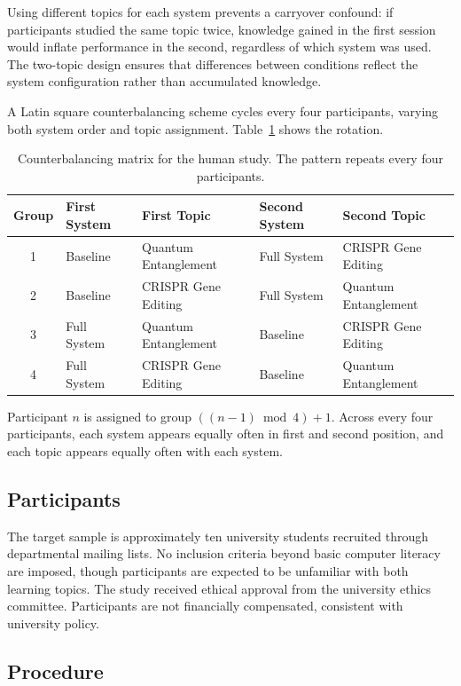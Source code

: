 \documentclass[logo,bsc,singlespacing,parskip,online]{infthesis}
\begin{document}
Using different topics for each system prevents a carryover confound: if participants studied the same topic twice, knowledge gained in the first session would inflate performance in the second, regardless of which system was used. The two-topic design ensures that differences between conditions reflect the system configuration rather than accumulated knowledge.

A Latin square counterbalancing scheme cycles every four participants, varying both system order and topic assignment. Table~\ref{tab:counterbalancing} shows the rotation.

\begin{table}[ht]
\centering
\caption{Counterbalancing matrix for the human study. The pattern repeats every four participants.}
\label{tab:counterbalancing}
\begin{tabular}{cllll}
\toprule
\textbf{Group} & \textbf{First System} & \textbf{First Topic} & \textbf{Second System} & \textbf{Second Topic} \\
\midrule
1 & Baseline & Quantum Entanglement & Full System & CRISPR Gene Editing \\
2 & Baseline & CRISPR Gene Editing & Full System & Quantum Entanglement \\
3 & Full System & Quantum Entanglement & Baseline & CRISPR Gene Editing \\
4 & Full System & CRISPR Gene Editing & Baseline & Quantum Entanglement \\
\bottomrule
\end{tabular}
\end{table}

Participant $n$ is assigned to group $((n - 1) \bmod 4) + 1$. Across every four participants, each system appears equally often in first and second position, and each topic appears equally often with each system.

\subsection{Participants}

The target sample is approximately ten university students recruited through departmental mailing lists. No inclusion criteria beyond basic computer literacy are imposed, though participants are expected to be unfamiliar with both learning topics. The study received ethical approval from the university ethics committee. Participants are not financially compensated, consistent with university policy.

\subsection{Procedure}
\end{document}
